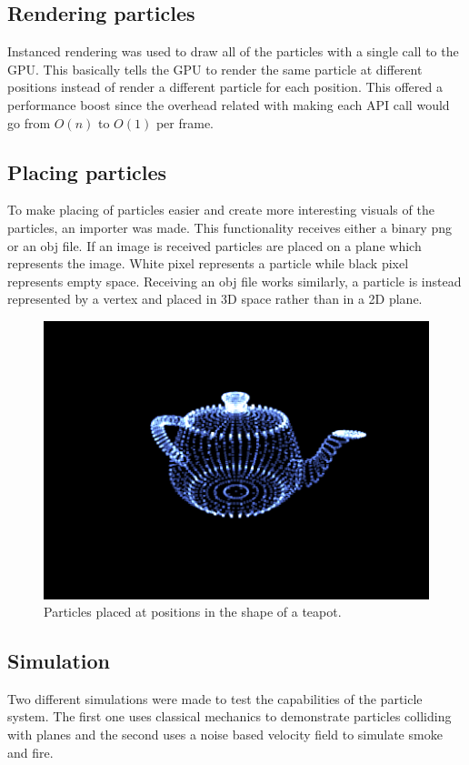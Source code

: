 \documentclass[report]{vgtc}
\begin{document}
\subsection{Rendering particles}
Instanced rendering was used to draw all of the particles with a single call to the GPU. This basically tells the GPU to render the same particle at different positions instead of render a different particle for each position. This offered a performance boost since the overhead related with making each API call would go from \(O(n)\) to \(O(1)\) per frame. 


\subsection{Placing particles}
To make placing of particles easier and create more interesting visuals of the particles, an importer was made. This functionality receives either a binary png or an obj file. If an image is received particles are placed on a plane which represents the image. White pixel represents a particle while black pixel represents empty space. 
Receiving an obj file works similarly, a particle is instead represented by a vertex and placed in 3D space rather than in a 2D plane.

\begin{figure}[H]
\includegraphics[scale=0.5]{img/teapot.png}
\caption{Particles placed at positions in the shape of a teapot.}
\end{figure}

\subsection{Simulation}
Two different simulations were made to test the capabilities of the particle system. The first one uses classical mechanics to demonstrate particles colliding with planes and the second uses a noise based velocity field to simulate smoke and fire. 
\end{document}
